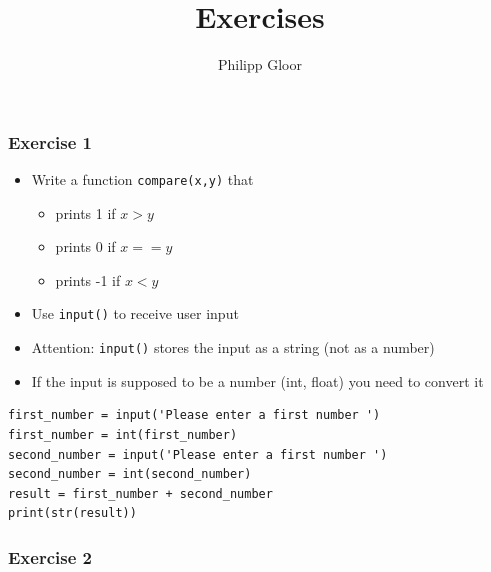 \documentclass[10pt, a4paper]{beamer} %
\title %
{Exercises}
\author %
{Philipp Gloor\inst{1}}
\institute
{
  \inst{1}%
  University of Zurich
}
\date{}
\begin{document}
\begin{frame}
\titlepage
\end{frame}

{
\bfseries
\begin{frame}\frametitle{Exercise 1}
    
\begin{itemize}
    \item Write a function \texttt{compare(x,y)} that
    \begin{itemize}
        \item prints 1 if $x > y$
        \item prints 0 if $x == y$
        \item prints -1 if $x < y$
    \end{itemize}
    \item Use \texttt{input()} to receive user input
\end{itemize}

\framebreak

\begin{itemize}
    \item Attention: \texttt{input()} stores the input as a string (not as a number)
    \item If the input is supposed to be a number (int, float) you need to convert it
\end{itemize}

{
\mdseries
{}
\begin{lstlisting}
first_number = input('Please enter a first number ')
first_number = int(first_number)
second_number = input('Please enter a first number ')
second_number = int(second_number)
result = first_number + second_number
print(str(result))
\end{lstlisting}
}

\end{frame}

\begin{frame}[c, fragile]\frametitle{Exercise 2}
    

\end{frame}}
\end{document}
